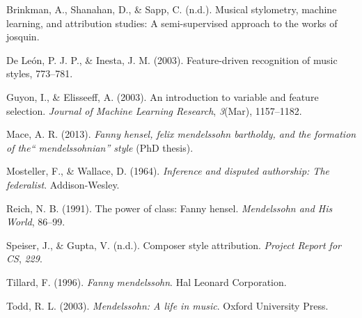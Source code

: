 \documentclass[12pt,twoside]{reedthesis}
\theoremstyle{definition}
\theoremstyle{definition}
\theoremstyle{definition}
\theoremstyle{remark}
\begin{document}
\hypertarget{ref-brinkman2016}{}
Brinkman, A., Shanahan, D., \& Sapp, C. (n.d.). Musical stylometry,
machine learning, and attribution studies: A semi-supervised approach to
the works of josquin.

\hypertarget{ref-de2003feature}{}
De León, P. J. P., \& Inesta, J. M. (2003). Feature-driven recognition
of music styles, 773--781.

\hypertarget{ref-guyon2003}{}
Guyon, I., \& Elisseeff, A. (2003). An introduction to variable and
feature selection. \emph{Journal of Machine Learning Research},
\emph{3}(Mar), 1157--1182.

\hypertarget{ref-mace2013}{}
Mace, A. R. (2013). \emph{Fanny hensel, felix mendelssohn bartholdy, and
the formation of the`` mendelssohnian'' style} (PhD thesis).

\hypertarget{ref-mosteller1964inference}{}
Mosteller, F., \& Wallace, D. (1964). \emph{Inference and disputed
authorship: The federalist}. Addison-Wesley.

\hypertarget{ref-reich1991}{}
Reich, N. B. (1991). The power of class: Fanny hensel. \emph{Mendelssohn
and His World}, 86--99.

\hypertarget{ref-CompStyleAttri}{}
Speiser, J., \& Gupta, V. (n.d.). Composer style attribution.
\emph{Project Report for CS}, \emph{229}.

\hypertarget{ref-tillard1996}{}
Tillard, F. (1996). \emph{Fanny mendelssohn}. Hal Leonard Corporation.

\hypertarget{ref-todd2003}{}
Todd, R. L. (2003). \emph{Mendelssohn: A life in music}. Oxford
University Press.


\end{document}
